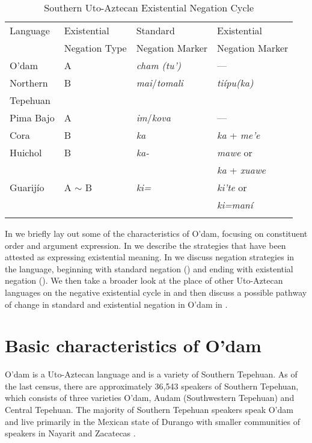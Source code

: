 \documentclass[output=paper,draft,draftmode,colorlinks,citecolor=brown]{langscibook}
\begin{document}
\begin{table}
\caption{Southern Uto-Aztecan Existential Negation Cycle}
\label{tab:odam-suaexcyc}
\begin{tabularx}{\textwidth}{lQQQ}
     \lsptoprule
     Language & Existential & Standard & Existential \\
     &  Negation Type &   Negation Marker &   Negation Marker\\
     \midrule
 O'dam    & A   &   \emph{ cham (tu')}    &  --- \\
 \tablevspace
 Northern & B & \emph{mai}/\emph{tomali} & \emph {tiípu(ka)} \\
 Tepehuan   &   &   &\\
 \tablevspace
 Pima Bajo & A  &   \emph{im}/\emph{kova} & --- \\
 \tablevspace
 Cora & B   &   \emph{ka}    &   \emph{ka} + \emph{me'e}\\
 \tablevspace
 Huichol & B    & \emph{ka-}    &   \emph{mawe} or \\
 & & & \emph{ka} + \emph{xuawe}\\
 \tablevspace
 Guarijío & A $\sim$ B &   \emph{ki=}  &   \emph{ki'te} or \\
    &   &   &   \emph{ki=maní}\\
 \lspbottomrule
\end{tabularx}
\end{table}

In  we briefly lay out some of the characteristics of O’dam, focusing on constituent order and argument expression. In  we describe the strategies that have been attested as expressing existential meaning. In  we discuss negation strategies in the language, beginning with standard negation () and ending with existential negation (). We then take a broader look at the place of other Uto-Aztecan languages on the negative existential cycle in  and then discuss a possible pathway of change in standard and existential negation in O'dam in .

\section{Basic characteristics of O’dam}
\label{sec:odam-basicchar}
O'dam is a Uto-Aztecan language and is a variety of Southern Tepehuan.
As of the last census, there are  approximately 36,543 speakers of Southern Tepehuan, which consists of three varieties O'dam, Audam (Southwestern Tepehuan) and Central Tepehuan. The majority of Southern Tepehuan speakers speak O'dam and live primarily in the Mexican state of Durango with smaller communities of speakers in Nayarit and Zacatecas \citep{inegi2010}.
\end{document}
